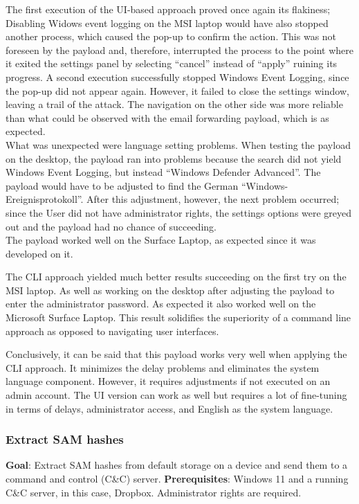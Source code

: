 The first execution of the UI-based approach proved once again its flakiness; Disabling Widows event logging on the MSI laptop would have also stopped another process, which caused the pop-up to confirm the action. This was not foreseen by the payload and, therefore, interrupted the process to the point where it exited the settings panel by selecting ``cancel'' instead of ``apply'' ruining its progress. A second execution successfully stopped Windows Event Logging, since the pop-up did not appear again. However, it failed to close the settings window, leaving a trail of the attack. The navigation on the other side was more reliable than what could be observed with the email forwarding payload, which is as expected. \\
What was unexpected were language setting problems. When testing the payload on the desktop, the payload ran into problems because the search did not yield Windows Event Logging, but instead ``Windows Defender Advanced''. The payload would have to be adjusted to find the German ``Windows-Ereignisprotokoll''. After this adjustment, however, the next problem occurred; since the User did not have administrator rights, the settings options were greyed out and the payload had no chance of succeeding. \\
The payload worked well on the Surface Laptop, as expected since it was developed on it.

The CLI approach yielded much better results succeeding on the first try on the MSI laptop. As well as working on the desktop after adjusting the payload to enter the administrator password. As expected it also worked well on the Microsoft Surface Laptop. This result solidifies the superiority of a command line approach as opposed to navigating user interfaces. 


Conclusively, it can be said that this payload works very well when applying the CLI approach. It minimizes the delay problems and eliminates the system language component. However, it requires adjustments if not executed on an admin account. The UI version can work as well but requires a lot of fine-tuning in terms of delays, administrator access, and English as the system language. 



\subsubsection{Extract SAM hashes}

\textbf{Goal}: Extract SAM hashes from default storage on a device and send them to a command and control (C\&C) server.
\textbf{Prerequisites}: Windows 11 and a running C\&C server, in this case, Dropbox. Administrator rights are required.

